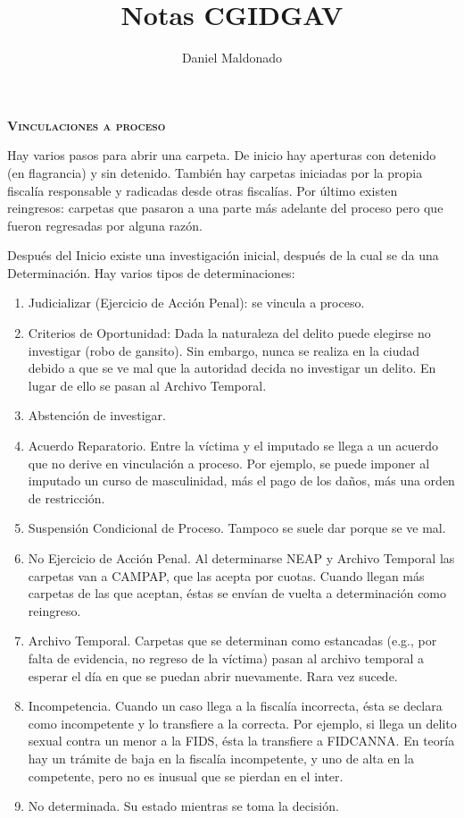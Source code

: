 \documentclass[a4paper,12pt]{article}
\title{Notas CGIDGAV}
\author{Daniel Maldonado}
\date{}
\begin{document}
{\scshape\bfseries \maketitle}

{\noindent\scshape\bfseries Vinculaciones a proceso}

Hay varios pasos para abrir una carpeta.
De inicio hay aperturas con detenido (en flagrancia) y sin detenido.
También hay carpetas iniciadas por la propia fiscalía responsable y radicadas desde otras fiscalías.
Por último existen reingresos: carpetas que pasaron a una parte más adelante del proceso pero que fueron regresadas por alguna razón.

Después del Inicio existe una investigación inicial, después de la cual se da una Determinación.
Hay varios tipos de determinaciones:
\begin{enumerate}
    \item Judicializar (Ejercicio de Acción Penal): se vincula a proceso.
    \item Criterios de Oportunidad: Dada la naturaleza del delito puede elegirse no investigar (robo de gansito).
	Sin embargo, nunca se realiza en la ciudad debido a que se ve mal que la autoridad decida no investigar un delito.
	En lugar de ello se pasan al Archivo Temporal.
    \item Abstención de investigar.
    \item Acuerdo Reparatorio. Entre la víctima y el imputado se llega a un acuerdo que no derive en vinculación a proceso.
	Por ejemplo, se puede imponer al imputado un curso de masculinidad, más el pago de los daños, más una orden de restricción.
    \item Suspensión Condicional de Proceso. Tampoco se suele dar porque se ve mal.
    \item No Ejercicio de Acción Penal. Al determinarse NEAP y Archivo Temporal las carpetas van a CAMPAP, que las acepta por cuotas. Cuando llegan más carpetas de las que aceptan, éstas se envían de vuelta a determinación como reingreso.
    \item Archivo Temporal. Carpetas que se determinan como estancadas (e.g., por falta de evidencia, no regreso de la víctima) pasan al archivo temporal a esperar el día en que se puedan abrir nuevamente.
	Rara vez sucede.
    \item Incompetencia. Cuando un caso llega a la fiscalía incorrecta, ésta se declara como incompetente y lo transfiere a la correcta.
	Por ejemplo, si llega un delito sexual contra un menor a la FIDS, ésta la transfiere a FIDCANNA.
	En teoría hay un trámite de baja en la fiscalía incompetente, y uno de alta en la competente, pero no es inusual que se pierdan en el inter.
    \item No determinada. Su estado mientras se toma la decisión.
\end{enumerate}
\end{document}
